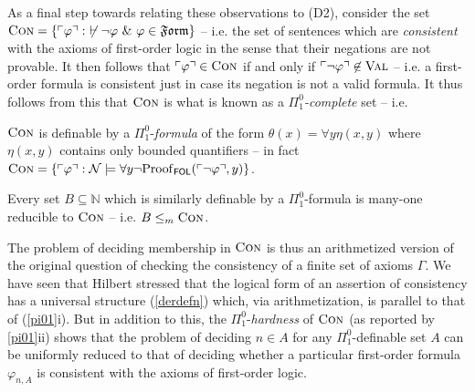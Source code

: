 \documentclass[11pt,fleqn,leqno]{article}
\def\phi{\varphi}
\def\A{\forall}
\def\proves{\vdash}
\begin{document}
As a final step towards relating these observations to (D2), consider the set  $\textsc{Con} = \{\ulcorner \phi \urcorner : \ \not\proves \neg \phi\ \& \ \phi \in \mathfrak{Form}\}$ -- i.e. the set of sentences which are \textsl{consistent} with the axioms of first-order logic in the sense that their negations are not provable.  It then follows that $\ulcorner \phi \urcorner \in \textsc{Con}$ if and only if $\ulcorner \neg \phi \urcorner \not\in \textsc{Val}$ -- i.e. a first-order formula is consistent just in case its negation is not a valid formula.   It thus follows from this that $\textsc{Con}$ is what is known as a \textsl{$\Pi^0_1$-complete} set -- i.e.
\begin{example}
\label{pi01}
\begin{compactenum}[i)]
\item $\textsc{Con}$ is definable by a $\Pi^0_1$-\textsl{formula} of the form $\theta(x) = \A y \eta(x,y)$ where $\eta(x,y)$ contains only bounded quantifiers -- in fact $\textsc{Con} = \{\ulcorner \phi \urcorner : \mathcal{N} \models \forall y \neg \mathrm{Proof}_{\mathsf{FOL}}(\ulcorner \neg \phi \urcorner,y)\}$.
\item  Every set $B \subseteq \mathbb{N}$ which is similarly definable by a $\Pi^0_1$-formula is many-one reducible to $\textsc{Con}$ -- i.e. $B \leq_m \textsc{Con}$.   
\end{compactenum}
\end{example}

The problem of deciding membership in $\textsc{Con}$ is thus an arithmetized version of the original question of checking the consistency of a finite set of axioms $\Gamma$.   We have seen that Hilbert stressed that the logical form of an assertion of consistency has a universal structure (\ref{derdefn}) which, via arithmetization, is parallel to that of (\ref{pi01}i).   But in addition to this, the $\Pi^0_1$-\textsl{hardness} of $\textsc{Con}$ (as reported by \ref{pi01}ii)  shows that the problem of deciding $n \in A$ for any $\Pi^0_1$-definable set $A$ can be uniformly reduced to that of deciding whether a particular first-order formula $\phi_{n,A}$ is consistent with the axioms of first-order logic.   
\end{document}
